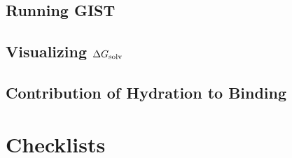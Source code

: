\documentclass[9pt,tutorial]{livecoms}
\newcommand{\dgsolv}{\Delta G_\textup{solv}}
\begin{document}
\subsection{Running GIST}
\subsection{Visualizing $\dgsolv$}
\subsection{Contribution of Hydration to Binding}

%

\section{Checklists}
\end{document}
